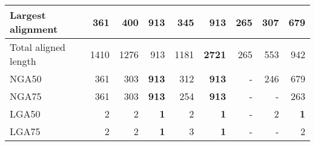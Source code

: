 \documentclass[12pt,a4paper]{article}
\begin{document}
\begin{table}[ht]
\begin{center}
\begin{tabular}{|l*{8}{|r}|}
Largest alignment & 361 & 400 & {\bf 913} & 345 & {\bf 913} & 265 & 307 & 679 \\ \hline
Total aligned length & 1410 & 1276 & 913 & 1181 & {\bf 2721} & 265 & 553 & 942 \\ \hline
NGA50 & 361 & 303 & {\bf 913} & 312 & {\bf 913} & - & 246 & 679 \\ \hline
NGA75 & 361 & 303 & {\bf 913} & 254 & {\bf 913} & - & - & 263 \\ \hline
LGA50 & 2 & 2 & {\bf 1} & 2 & {\bf 1} & - & 2 & {\bf 1} \\ \hline
LGA75 & 2 & 2 & {\bf 1} & 3 & {\bf 1} & - & - & 2 \\ \hline
\end{tabular}
\end{center}
\end{table}
\end{document}
